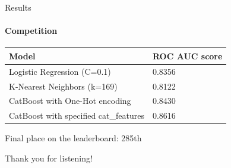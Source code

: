 \documentclass[dvipsnames, handout]{beamer}
\newcommand{\1}{\mathds{1}}	%
\begin{document}
\begin{frame}{Results}
\framesubtitle{Competition}
    
    \begin{tabular}{|l|l|}
        \hline
    \textbf{Model} & \textbf{ROC AUC score} \\ 
    \hline \hline
    Logistic Regression (C=0.1) & 0.8356 \\ \hline
    K-Nearest Neighbors (k=169) & 0.8122 \\ \hline
    CatBoost with One-Hot encoding & 0.8430 \\ \hline
    CatBoost with specified cat\_features & 0.8616 \\ \hline
    \end{tabular}
    \vspace{5pt}
    \begin{center}
        Final place on the leaderboard: 285th    
    \end{center}
    
\end{frame}

\begin{frame}
\begin{center}
{\large\color{titleText} Thank you for listening!}
\vspace{1cm}
\end{center}
\end{frame}

\end{document}
